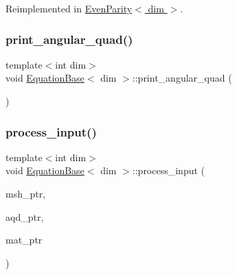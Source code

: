 Reimplemented in \hyperlink{class_even_parity_a4cc64002161193e2227e962c9ecb8cf5}{Even\+Parity$<$ dim $>$}.

\mbox{\label{class_equation_base_acf618369789a383d0aeebd70ddd60b9e}} 
\subsubsection{\texorpdfstring{print\+\_\+angular\+\_\+quad()}{print\_angular\_quad()}}
{\footnotesize\ttfamily template$<$int dim$>$ \\
void \hyperlink{class_equation_base}{Equation\+Base}$<$ dim $>$\+::print\+\_\+angular\+\_\+quad (\begin{DoxyParamCaption}{ }\end{DoxyParamCaption})\hspace{0.3cm}{\ttfamily [private]}}

\mbox{\label{class_equation_base_afd853e7e9fd859216a705a517235c6ba}} 
\subsubsection{\texorpdfstring{process\+\_\+input()}{process\_input()}}
{\footnotesize\ttfamily template$<$int dim$>$ \\
void \hyperlink{class_equation_base}{Equation\+Base}$<$ dim $>$\+::process\+\_\+input (\begin{DoxyParamCaption}\item[{const std\+\_\+cxx11\+::shared\+\_\+ptr$<$ \hyperlink{class_mesh_generator}{Mesh\+Generator}$<$ dim $>$ $>$}]{msh\+\_\+ptr,  }\item[{const std\+\_\+cxx11\+::shared\+\_\+ptr$<$ \hyperlink{class_a_q_base}{A\+Q\+Base}$<$ dim $>$ $>$}]{aqd\+\_\+ptr,  }\item[{const std\+\_\+cxx11\+::shared\+\_\+ptr$<$ \hyperlink{class_material_properties}{Material\+Properties} $>$}]{mat\+\_\+ptr }\end{DoxyParamCaption})\hspace{0.3cm}{\ttfamily [private]}}

